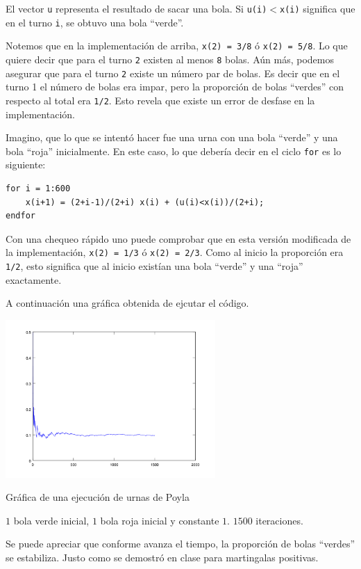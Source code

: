 El vector \texttt{u} representa el resultado de sacar una bola. Si \texttt{u(i)$<$x(i)} significa que en el turno \texttt{i}, 
se obtuvo una bola ``verde''.\par\null

Notemos que en la implementación de arriba, \texttt{x(2) = 3/8} ó \texttt{x(2) = 5/8}. Lo que quiere decir que para 
el turno \texttt{2} existen al menos \texttt{8} bolas. Aún más, podemos asegurar que para el turno \texttt{2} existe 
un número par de bolas. Es decir que en el turno 1 el número de bolas era impar, pero la proporción de bolas ``verdes'' 
con respecto al total era \texttt{1/2}. Esto revela que existe un error de desfase en la implementación.\par\null 

Imagino, que lo que se intentó hacer fue una urna con una bola ``verde'' y una bola ``roja'' inicialmente. En este caso, lo que 
debería decir en el ciclo \texttt{for} es lo siguiente:\par\null

\begin{verbatim}
for i = 1:600
    x(i+1) = (2+i-1)/(2+i) x(i) + (u(i)<x(i))/(2+i);
endfor
\end{verbatim}\par\null

Con una chequeo rápido uno puede comprobar que en esta versión modificada de la implementación, \texttt{x(2) = 1/3} ó \texttt{x(2) = 2/3}. 
Como al inicio la proporción era \texttt{1/2}, esto significa que al inicio existían una bola ``verde'' y una ``roja'' exactamente.\par\null

A continuación una gráfica obtenida de ejcutar el código.

\begin{center}
    \includegraphics[width=8cm]{tarea2/problema2_2/poyla.PNG}
\end{center}
\begin{center}
    Gráfica de una ejecución de urnas de Poyla \par
    $1$ bola verde inicial, $1$ bola roja inicial y constante $1$. $1500$ iteraciones.
\end{center}\par\null

Se puede apreciar que conforme avanza el tiempo, la proporción de bolas ``verdes'' se estabiliza. Justo como se demostró en clase para
martingalas positivas.